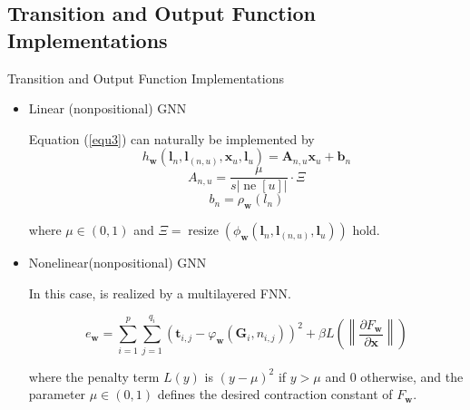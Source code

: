 \documentclass[10pt,aspectratio=169]{beamer}
\begin{document}
\subsection{Transition and Output Function Implementations}
\begin{frame}[allowframebreaks]{Transition and Output Function Implementations}
    \begin{itemize}
        \item Linear (nonpositional) GNN

              Equation (\ref{equ3}) can naturally be implemented by
              \begin{equation}
                  h_{\boldsymbol{w}}\left(\boldsymbol{l}_{n}, \boldsymbol{l}_{(n, u)}, \boldsymbol{x}_{u}, \boldsymbol{l}_{u}\right)=\boldsymbol{A}_{n, u} \boldsymbol{x}_{u}+\boldsymbol{b}_{n}
              \end{equation}
              \begin{equation}
                  A_{n, u} =\frac{\mu}{s|\operatorname{ne}[u]|} \cdot \Xi
              \end{equation}
              \begin{equation}
                  b_{n} =\rho_{\boldsymbol{w}}\left(l_{n}\right)
              \end{equation}

              where $\mu \in(0,1)$ and $\Xi=\operatorname{resize}\left(\phi_{\boldsymbol{w}}\left(\boldsymbol{l}_{n}, \boldsymbol{l}_{(n, u)}, \boldsymbol{l}_{u}\right)\right)$ hold.

              \framebreak

        \item Nonelinear(nonpositional) GNN

              In this case, is realized by a multilayered FNN.

              \begin{equation}
                  e_{\boldsymbol{w}}=\sum_{i=1}^{p} \sum_{j=1}^{q_{i}}\left(\boldsymbol{t}_{i, j}-\varphi_{\boldsymbol{w}}\left(\boldsymbol{G}_{i}, n_{i, j}\right)\right)^{2}+\beta L\left(\left\|\frac{\partial F_{\boldsymbol{w}}}{\partial \boldsymbol{x}}\right\|\right)
              \end{equation}

              where the penalty term $L(y)$ is $(y-\mu)^{2}$ if $y>\mu$ and 0 otherwise, and the parameter $\mu \in(0,1)$ defines the desired contraction constant of $F_{\boldsymbol{w}}$.

    \end{itemize}
\end{frame}
\end{document}
